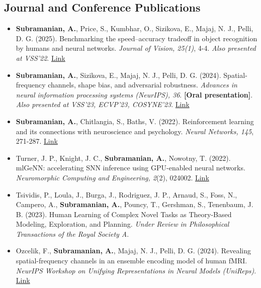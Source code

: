 \documentclass[10pt,letterpaper]{article}
\begin{document}
\subsection*{\Large Journal and Conference Publications}
\begin{itemize}[leftmargin=1em,itemsep=0.3em]

    \item \textbf{Subramanian, A.}, Price, S., Kumbhar, O., Sizikova, E., Majaj, N. J., Pelli, D. G. (2025). Benchmarking the speed–accuracy tradeoff in object recognition by humans and neural networks. \textit{Journal of Vision, 25(1)}, 4-4. \textit{Also presented at VSS'22}. \href{https://doi.org/10.1167/jov.25.1.4}{Link}

    \item \textbf{Subramanian, A.}, Sizikova, E., Majaj, N. J., Pelli, D. G. (2024). Spatial-frequency channels, shape bias, and adversarial robustness. \textit{Advances in neural information processing systems (NeurIPS), 36}. \textbf{[Oral presentation]}. \textit{Also presented at VSS'23, ECVP'23, COSYNE'23}. \href{https://proceedings.neurips.cc/paper_files/paper/2023/hash/0cdc1e85736d9c01d366cbf9b4b81672-Abstract-Conference.html}{Link}

    \item \textbf{Subramanian, A.}, Chitlangia, S., Baths, V. (2022). Reinforcement learning and its connections with neuroscience and psychology. \textit{Neural Networks, 145}, 271-287. \href{https://www.sciencedirect.com/science/article/abs/pii/S0893608021003944}{Link}

    \item Turner, J. P., Knight, J. C., \textbf{Subramanian, A.}, Nowotny, T. (2022). mlGeNN: accelerating SNN inference using GPU-enabled neural networks. \textit{Neuromorphic Computing and Engineering, 2}(2), 024002. \href{https://iopscience.iop.org/article/10.1088/2634-4386/ac5ac5/meta}{Link}

    \item Tsividis, P., Loula, J., Burga, J., Rodriguez, J. P., Arnaud, S., Foss, N., Campero, A., \textbf{Subramanian, A.}, Pouncy, T., Gershman, S., Tenenbaum, J. B. (2023). Human Learning of Complex Novel Tasks as Theory-Based Modeling, Exploration, and Planning. \textit{Under Review in Philosophical Transactions of the Royal Society A}.
    
    \item Ozcelik, F., \textbf{Subramanian, A.}, Majaj, N. J., Pelli, D. G. (2024). Revealing spatial-frequency channels in an ensemble encoding model of human fMRI. \textit{NeurIPS Workshop on Unifying Representations in Neural Models (UniReps)}. \href{https://openreview.net/forum?id=O8nVUbyvTC#discussion}{Link}


\end{itemize}
\end{document}
